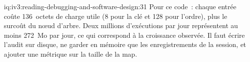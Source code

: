 \begin{solution}{iq:iv3:reading-debugging-and-software-design:31}
Pour ce code~: chaque entrée coûte 136~octets de charge utile (8 pour la clé et 128 pour l'ordre), plus le surcoût du nœud d'arbre. Deux millions d'exécutions par jour représentent au moins 272~Mo par jour, ce qui correspond à la croissance observée. Il faut écrire l'audit sur disque, ne garder en mémoire que les enregistrements de la session, et ajouter une métrique sur la taille de la map.


\end{solution}

